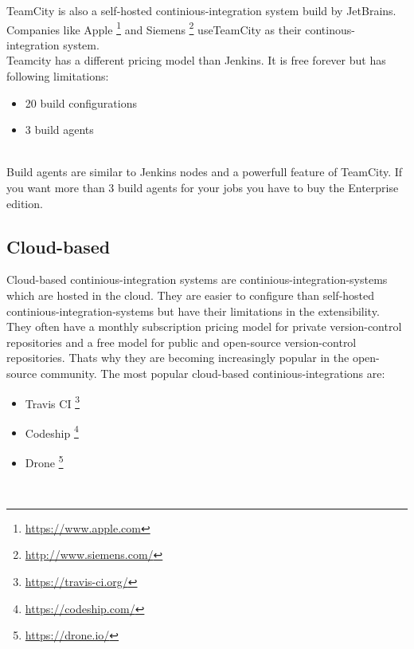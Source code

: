 TeamCity is also a self-hosted continious-integration system build by JetBrains. Companies like
Apple \footnote{\url{https://www.apple.com}} and Siemens \footnote{\url{http://www.siemens.com/}} useTeamCity as their continous-integration system.\\
Teamcity has a different pricing model than Jenkins. 
It is free forever but has following limitations:
\begin{itemize} 
        \item 20 build configurations
        \item 3 build agents
\end{itemize}\\
Build agents are similar to Jenkins nodes and a powerfull feature of TeamCity. If you want more than 3 build agents for your jobs you have to buy the Enterprise edition.

\subsection{Cloud-based}\label{sec:tooling-cloud-based}

Cloud-based continious-integration systems are continious-integration-systems which are hosted in the cloud.
They are easier to configure than self-hosted continious-integration-systems but have their limitations in the extensibility.
They often have a monthly subscription pricing model for private version-control repositories 
and a free model for public and open-source version-control repositories.
Thats why they are becoming increasingly popular in the open-source community.
The most popular cloud-based continious-integrations are:
\begin{itemize} 
    \item Travis CI \footnote{\url{https://travis-ci.org/}}

    \item Codeship \footnote{\url{https://codeship.com/}}

    \item Drone \footnote{\url{https://drone.io/}}

\end{itemize}\\

